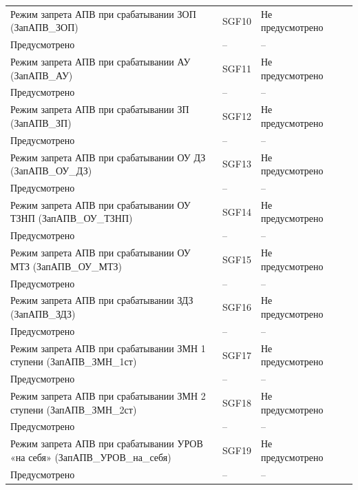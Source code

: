 \begin{longtable}{|>{\centering\arraybackslash}m{5.3cm}|>{\centering\arraybackslash}m{3.3cm}|>{\centering\arraybackslash}m{4.2cm}|>{\centering\arraybackslash}m{1.8cm}|>{\centering\arraybackslash}m{1cm}|}
\hline
\centering Режим запрета АПВ при срабатывании ЗОП (ЗапАПВ\_ЗОП)  & \centering SGF10 & \centering Не предусмотрено \\ Предусмотрено & \centering -- & \centering \arraybackslash -- \\
\hline
\centering Режим запрета АПВ при срабатывании АУ (ЗапАПВ\_АУ)  & \centering SGF11 & \centering Не предусмотрено \\ Предусмотрено & \centering -- & \centering \arraybackslash -- \\
\hline
\centering Режим запрета АПВ при срабатывании ЗП (ЗапАПВ\_ЗП)  & \centering SGF12 & \centering Не предусмотрено \\ Предусмотрено & \centering -- & \centering \arraybackslash -- \\
\hline
\centering Режим запрета АПВ при срабатывании ОУ ДЗ (ЗапАПВ\_ОУ\_ДЗ)  & \centering SGF13 & \centering Не предусмотрено \\ Предусмотрено & \centering -- & \centering \arraybackslash -- \\
\hline
\centering Режим запрета АПВ при срабатывании ОУ ТЗНП (ЗапАПВ\_ОУ\_ТЗНП)  & \centering SGF14 & \centering Не предусмотрено \\ Предусмотрено & \centering -- & \centering \arraybackslash -- \\
\hline
\centering Режим запрета АПВ при срабатывании ОУ МТЗ (ЗапАПВ\_ОУ\_МТЗ)  & \centering SGF15 & \centering Не предусмотрено \\ Предусмотрено & \centering -- & \centering \arraybackslash -- \\
\hline
\centering Режим запрета АПВ при срабатывании ЗДЗ (ЗапАПВ\_ЗДЗ)  & \centering SGF16 & \centering Не предусмотрено \\ Предусмотрено & \centering -- & \centering \arraybackslash -- \\
\hline
\centering Режим запрета АПВ при срабатывании ЗМН 1 ступени (ЗапАПВ\_ЗМН\_1ст)  & \centering SGF17 & \centering Не предусмотрено \\ Предусмотрено & \centering -- & \centering \arraybackslash -- \\
\hline
\centering Режим запрета АПВ при срабатывании ЗМН 2 ступени (ЗапАПВ\_ЗМН\_2ст)  & \centering SGF18 & \centering Не предусмотрено \\ Предусмотрено & \centering -- & \centering \arraybackslash -- \\
\hline
\centering Режим запрета АПВ при срабатывании УРОВ «на себя» (ЗапАПВ\_УРОВ\_на\_себя)  & \centering SGF19 & \centering Не предусмотрено \\ Предусмотрено & \centering -- & \centering \arraybackslash -- \\

\end{longtable}
